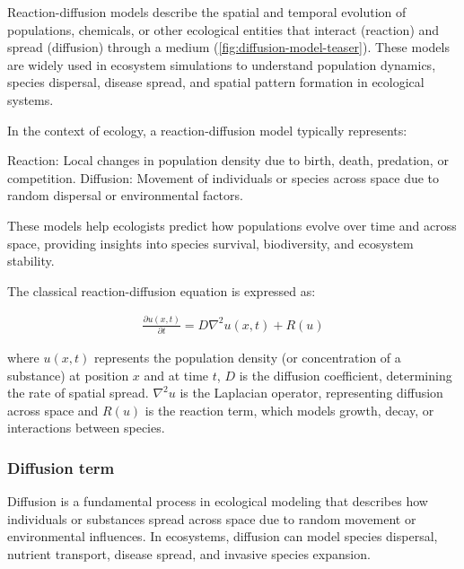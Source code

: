
Reaction-diffusion models describe the spatial and temporal evolution of populations, chemicals, or other ecological entities that interact (reaction) and spread (diffusion) through a medium (\cref{fig:diffusion-model-teaser}). These models are widely used in ecosystem simulations to understand population dynamics, species dispersal, disease spread, and spatial pattern formation in ecological systems.

In the context of ecology, a reaction-diffusion model typically represents:
\begin{Itemize}
    \Item{} Reaction: Local changes in population density due to birth, death, predation, or competition.
    \Item{} Diffusion: Movement of individuals or species across space due to random dispersal or environmental factors.
\end{Itemize}
These models help ecologists predict how populations evolve over time and across space, providing insights into species survival, biodiversity, and ecosystem stability.

The classical reaction-diffusion equation is expressed as:

\begin{align}
    \label{eq:env-obj_classic-reaction-diffusion}
    \frac{\partial u (x, t)}{\partial t} = D \nabla^2 u(x, t) + R(u)
\end{align}

where $u(x,t)$ represents the population density (or concentration of a substance) at position $x$ and at time $t$, $D$ is the diffusion coefficient, determining the rate of spatial spread. $\nabla^2 u$ is the Laplacian operator, representing diffusion across space and $R(u)$ is the reaction term, which models growth, decay, or interactions between species.

\subsubsection{Diffusion term}
Diffusion is a fundamental process in ecological modeling that describes how individuals or substances spread across space due to random movement or environmental influences. In ecosystems, diffusion can model species dispersal, nutrient transport, disease spread, and invasive species expansion.

